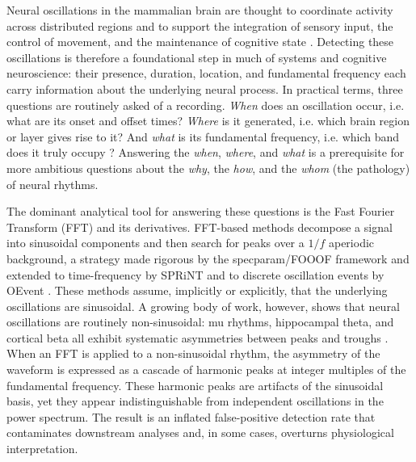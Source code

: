 \documentclass[11pt]{article}
\begin{document}
Neural oscillations in the mammalian brain are thought to coordinate activity across distributed regions and to support the integration of sensory input, the control of movement, and the maintenance of cognitive state \citep{buzsaki2004neuronal,fries2015rhythms,giraud2012cortical,jensen2010shaping}. Detecting these oscillations is therefore a foundational step in much of systems and cognitive neuroscience: their presence, duration, location, and fundamental frequency each carry information about the underlying neural process. In practical terms, three questions are routinely asked of a recording. \emph{When} does an oscillation occur, i.e. what are its onset and offset times? \emph{Where} is it generated, i.e. which brain region or layer gives rise to it? And \emph{what} is its fundamental frequency, i.e. which band does it truly occupy \citep{buzsaki2004neuronal,pfurtscheller1999eventrelated}? Answering the \emph{when}, \emph{where}, and \emph{what} is a prerequisite for more ambitious questions about the \emph{why}, the \emph{how}, and the \emph{whom} (the pathology) of neural rhythms.

The dominant analytical tool for answering these questions is the Fast Fourier Transform (FFT) and its derivatives. FFT-based methods decompose a signal into sinusoidal components and then search for peaks over a $1/f$ aperiodic background, a strategy made rigorous by the specparam/FOOOF framework \citep{donoghue2020parameterizing} and extended to time-frequency by SPRiNT \citep{wilson2022sprint} and to discrete oscillation events by OEvent \citep{neymotin2022oevent}. These methods assume, implicitly or explicitly, that the underlying oscillations are sinusoidal. A growing body of work, however, shows that neural oscillations are routinely non-sinusoidal: mu rhythms, hippocampal theta, and cortical beta all exhibit systematic asymmetries between peaks and troughs \citep{belluscio2012crossfrequency,cole2017waveform,cole2019cycle,donoghue2022methodological}. When an FFT is applied to a non-sinusoidal rhythm, the asymmetry of the waveform is expressed as a cascade of harmonic peaks at integer multiples of the fundamental frequency. These harmonic peaks are artifacts of the sinusoidal basis, yet they appear indistinguishable from independent oscillations in the power spectrum. The result is an inflated false-positive detection rate that contaminates downstream analyses and, in some cases, overturns physiological interpretation.
\end{document}

